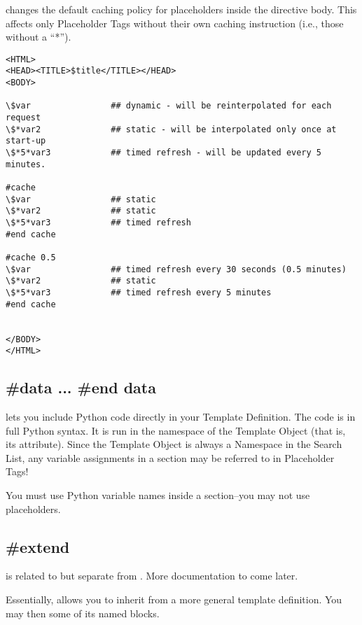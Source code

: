 { changes the default caching policy for placeholders inside the
directive body.  This affects only Placeholder Tags without their own caching
instruction (i.e., those without a ``*'').

\begin{verbatim}
<HTML>
<HEAD><TITLE>$title</TITLE></HEAD>
<BODY>

\$var                ## dynamic - will be reinterpolated for each request
\$*var2              ## static - will be interpolated only once at start-up
\$*5*var3            ## timed refresh - will be updated every 5 minutes.

#cache
\$var                ## static
\$*var2              ## static
\$*5*var3            ## timed refresh
#end cache

#cache 0.5
\$var                ## timed refresh every 30 seconds (0.5 minutes)
\$*var2              ## static
\$*5*var3            ## timed refresh every 5 minutes
#end cache


</BODY>
</HTML>
\end{verbatim}


\subsection{\#data ... \#end data}

 lets you include Python code directly in your Template 
Definition.  The code is in full Python syntax.  It is run in the namespace of
the Template Object (that is, its  attribute).  Since the Template
Object is always a Namespace in the Search List, any variable assignments in a
 section may be referred to in Placeholder Tags!

You must use Python variable names inside a  section--you may not
use placeholders.

\subsection{\#extend}

 is related to but separate from 
.  More documentation to come later.

Essentially,  allows you to inherit from
a more general template definition.  You may then  some of its
named blocks.

}
